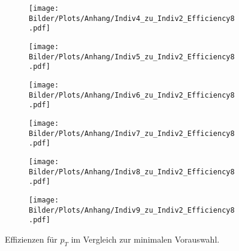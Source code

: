 \begin{figure}
  \begin{subfigure}[t]{0.5\textwidth}
  \texttt{[image: Bilder/Plots/Anhang/Indiv4\_zu\_Indiv2\_Efficiency8.pdf]}
  \end{subfigure}
\begin{subfigure}[t]{0.5\textwidth}
 \texttt{[image: Bilder/Plots/Anhang/Indiv5\_zu\_Indiv2\_Efficiency8.pdf]}
\end{subfigure}
\begin{subfigure}[t]{0.5\textwidth}
  \texttt{[image: Bilder/Plots/Anhang/Indiv6\_zu\_Indiv2\_Efficiency8.pdf]}
\end{subfigure}
\begin{subfigure}[t]{0.5\textwidth}
  \texttt{[image: Bilder/Plots/Anhang/Indiv7\_zu\_Indiv2\_Efficiency8.pdf]}
\end{subfigure}
\begin{subfigure}[t]{0.5\textwidth}
  \texttt{[image: Bilder/Plots/Anhang/Indiv8\_zu\_Indiv2\_Efficiency8.pdf]}
\end{subfigure}
\begin{subfigure}[t]{0.5\textwidth}
  \texttt{[image: Bilder/Plots/Anhang/Indiv9\_zu\_Indiv2\_Efficiency8.pdf]}
\end{subfigure}
\caption{Effizienzen für $p_T$ im Vergleich zur minimalen Vorauswahl.}
\end{figure}
\clearpage
